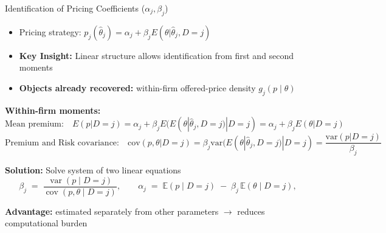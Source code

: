 \documentclass[10pt,aspectratio=169]{beamer}
\begin{document}
\begin{frame}{Identification of Pricing Coefficients ($\alpha_j, \beta_j$)}\label{appendix:slide3}
\begin{itemize}
  \item Pricing strategy: $p_j(\hat{\theta}_j) = \alpha_j + \beta_j E(\theta|\hat{\theta}_j, D=j)$
  \item \textbf{Key Insight:} Linear structure allows identification from first and second moments
  \item \textbf{Objects already recovered:} within-firm offered-price density $g_j(p\mid\theta)$ 
\end{itemize}

\textbf{Within-firm moments:} 
$$\text{Mean premium:} \quad  E(p|D=j) = \alpha_j + \beta_j E(E(\theta|\hat{\theta}_j, D=j)|D=j) = \alpha_j + \beta_j E(\theta|D=j) $$
\vspace{-.3cm}
$$\text{Premium and Risk covariance:} \quad  \text{cov}(p, \theta|D=j) = \beta_j \text{var}(E(\theta|\hat{\theta}_j, D=j)|D=j) = \frac{\text{var}(p|D=j)}{\beta_j} $$


\vspace{0.2cm}

\textbf{Solution:} Solve system of two linear equations
{\small
\[
\beta_j \;=\; \frac{\operatorname{var}(p\mid D=j)}{\operatorname{cov}(p,\theta\mid D=j)},
\qquad
\alpha_j \;=\; \mathbb{E}(p\mid D=j)\;-\;\beta_j\,\mathbb{E}(\theta\mid D=j),
\]
}

\textbf{Advantage:} estimated separately from other parameters $\rightarrow$ reduces computational burden\hyperlink{estimation:overview}{}

\end{frame}
\end{document}
